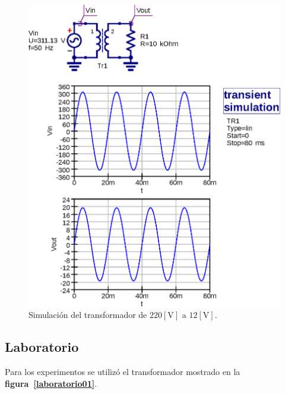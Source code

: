 \begin{figure}[!h]
\centering
\includegraphics[scale=0.75]{simulacion/01.transformador.eps}
\caption{Simulación del transformador de $220[\text{V}]$ a $12[\text{V}]$.}
\label{simulacion01}
\end{figure}

\subsection{Laboratorio}
Para los experimentos se utilizó el transformador mostrado en la
\textbf{figura~\ref{laboratorio01}}.


